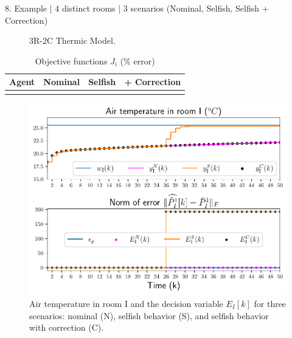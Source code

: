 \documentclass[presentation]{beamer}
\begin{document}
\begin{frame}
\begin{textblock}{15.6}
\begin{block}{8. Example | 4 distinct rooms | 3 scenarios (Nominal, Selfish, Selfish + Correction) }
\begin{minipage}[c]{27cm}
\begin{figure}[h]
\begin{tikzpicture}[european]
          \end{tikzpicture}
          \caption{3R-2C Thermic Model.}
        \end{figure}
        \begin{table}[h]
          \caption{Objective functions $J_{i}$ (\% error)}\label{tab:costsGlobalLocal}
          \begin{tabular}[t]{cccc}
            \toprule
            Agent  & Nominal & Selfish & + Correction\\
            \midrule
            \\
            \bottomrule
          \end{tabular}
        \end{table}
      \end{minipage}
      \hfill
      \begin{minipage}[c]{26cm}
        \begin{figure}[h]
          \includegraphics[width=\textwidth]{../img/airtemp_roomI/__ErrorWX_command_normErrH_poster.pdf}
          \caption{\centering Air temperature in room I and the decision variable $E_{I}[k]$ for three scenarios: nominal (N), selfish behavior (S),
            and selfish behavior with correction (C).}\label{fig:response3Scenarios}
        \end{figure}
      \end{minipage}
      \hfill
      \begin{minipage}[c]{26cm}
        \begin{figure}[h]

\end{figure}
\end{minipage}
\end{block}
\end{textblock}
\end{frame}
\end{document}
